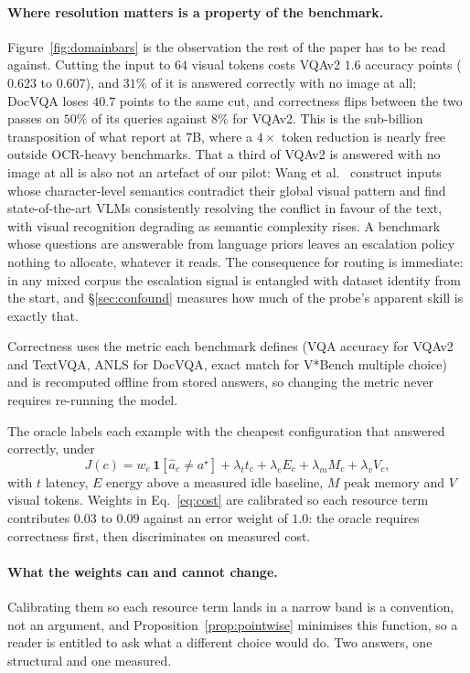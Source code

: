 \documentclass[10pt,twocolumn]{article}
\theoremstyle{plain}
\begin{document}
\paragraph{Where resolution matters is a property of the benchmark.}
Figure~\ref{fig:domainbars} is the observation the rest of the paper has to be
read against. Cutting the input to $64$ visual tokens costs VQAv2 $1.6$
accuracy points ($0.623$ to $0.607$), and $31\%$ of it is answered correctly
with no image at all; DocVQA loses $40.7$ points to the same cut, and
correctness flips between the two passes on $50\%$ of its queries against
$8\%$ for VQAv2. This is the sub-billion transposition of what
\cite{visionthink} report at $7$B, where a $4\times$ token reduction is nearly
free outside OCR-heavy benchmarks. That a third of VQAv2 is answered with no
image at all is also not an artefact of our pilot: Wang et al.~\cite{asciiart}
construct inputs whose character-level semantics contradict their global visual
pattern and find state-of-the-art VLMs consistently resolving the conflict in
favour of the text, with visual recognition degrading as semantic complexity
rises. A benchmark whose questions are answerable from language priors leaves
an escalation policy nothing to allocate, whatever it reads. The consequence for routing is immediate:
in any mixed corpus the escalation signal is entangled with dataset identity
from the start, and \S\ref{sec:confound} measures how much of the probe's
apparent skill is exactly that.

Correctness uses the metric each benchmark defines (VQA accuracy for VQAv2 and TextVQA, ANLS for DocVQA, exact match for V*Bench multiple choice) and is
recomputed offline from stored answers, so changing the metric never requires
re-running the model.

The oracle labels each example with the cheapest configuration that answered
correctly, under
\begin{equation}
J(c) = w_e\,\mathbf{1}[\hat a_c \neq a^\star]
     + \lambda_t t_c + \lambda_e E_c + \lambda_m M_c + \lambda_v V_c,
\label{eq:cost}
\end{equation}
with $t$ latency, $E$ energy above a measured idle baseline, $M$ peak memory
and $V$ visual tokens. Weights in Eq.~\ref{eq:cost} are calibrated so each
resource term contributes $0.03$ to $0.09$ against an error weight of $1.0$:
the oracle requires correctness first, then discriminates on measured cost.

\paragraph{What the weights can and cannot change.} Calibrating them so each
resource term lands in a narrow band is a convention, not an argument, and
Proposition~\ref{prop:pointwise} minimises this function, so a reader is entitled to ask what a
different choice would do. Two answers, one structural and one measured.
\end{document}
